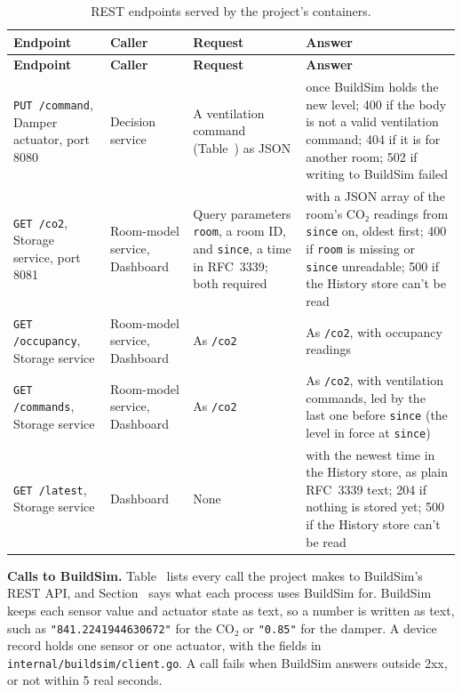 \documentclass[11pt]{article}
\def\ref#1{\getrefnumber{#1}}%
\begin{document}
\begin{longtable}[]{@{}
  >{\raggedright\arraybackslash}p{}
  >{\raggedright\arraybackslash}p{}
  >{\raggedright\arraybackslash}p{}
  >{\raggedright\arraybackslash}p{}@{}}
\caption{REST endpoints served by the project's containers.}\label{tab:endpoints}\\
\toprule
\textbf{Endpoint} & \textbf{Caller} & \textbf{Request} & \textbf{Answer} \\
\midrule
\endfirsthead
\toprule
\textbf{Endpoint} & \textbf{Caller} & \textbf{Request} & \textbf{Answer} \\
\midrule
\endhead
\texttt{PUT /command}, Damper actuator, port 8080 & Decision service & A
ventilation command (Table~\ref{tab:fields}) as JSON & 200 once BuildSim
holds the new level; 400 if the body is not a valid ventilation command;
404 if it is for another room; 502 if writing to BuildSim failed \\
\midrule
\texttt{GET /co2}, Storage service, port 8081 & Room-model service,
Dashboard & Query parameters \texttt{room}, a room ID, and
\texttt{since}, a time in RFC~3339; both required & 200 with a JSON array
of the room's CO₂ readings from \texttt{since} on, oldest first; 400 if
\texttt{room} is missing or \texttt{since} unreadable; 500 if the History
store can't be read \\
\midrule
\texttt{GET /occupancy}, Storage service & Room-model service, Dashboard
& As \texttt{/co2} & As \texttt{/co2}, with occupancy readings \\
\midrule
\texttt{GET /commands}, Storage service & Room-model service, Dashboard
& As \texttt{/co2} & As \texttt{/co2}, with ventilation commands, led by
the last one before \texttt{since} (the level in force at \texttt{since}) \\
\midrule
\texttt{GET /latest}, Storage service & Dashboard & None & 200 with the
newest time in the History store, as plain RFC~3339 text; 204 if nothing
is stored yet; 500 if the History store can't be read \\
\bottomrule
\end{longtable}

\textbf{Calls to BuildSim.} Table~\ref{tab:buildsim} lists every call
the project makes to BuildSim's REST API, and
Section~\ref{sec:usecase} says what each process uses BuildSim for.
BuildSim keeps each sensor value and actuator state as text, so a
number is written as text, such as \texttt{"841.2241944630672"} for the CO₂ or
\texttt{"0.85"} for the damper. A device record holds one sensor or one
actuator, with the fields in \texttt{internal/buildsim/client.go}. A call
fails when BuildSim answers outside 2xx, or not within 5 real seconds.
\end{document}
